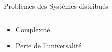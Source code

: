 \documentclass[presentation]{beamer}
\begin{document}
\begin{frame}[label={sec:org99a0d58}]{Problèmes des Systèmes distribués}
\begin{columns}
\begin{column}{0.60\columnwidth}
\begin{block}{}
\begin{itemize}
\item <1> Complexité
\item <2> Perte de \alert{l'universalité}
\end{itemize}
\begin{block}{}
\end{block}
\end{block}
\end{column}

\begin{column}{0.40\columnwidth}
\begin{block}{}
\end{block}
\end{column}
\end{columns}
\end{frame}
\end{document}
